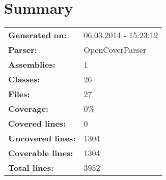 \documentclass[a4paper,10pt]{article}
\begin{document}
\setcounter{secnumdepth}{-1}
\section{Summary}
\begin{longtable}[l]{ll}
\textbf{Generated on:} & 06.03.2014 - 15:23:12\\
\textbf{Parser:} & OpenCoverParser\\
\textbf{Assemblies:} & 1\\
\textbf{Classes:} & 26\\
\textbf{Files:} & 27\\
\textbf{Coverage:} & 0\%\\
\textbf{Covered lines:} & 0\\
\textbf{Uncovered lines:} & 1304\\
\textbf{Coverable lines:} & 1304\\
\textbf{Total lines:} & 3952\\
\end{longtable}
\end{document}
